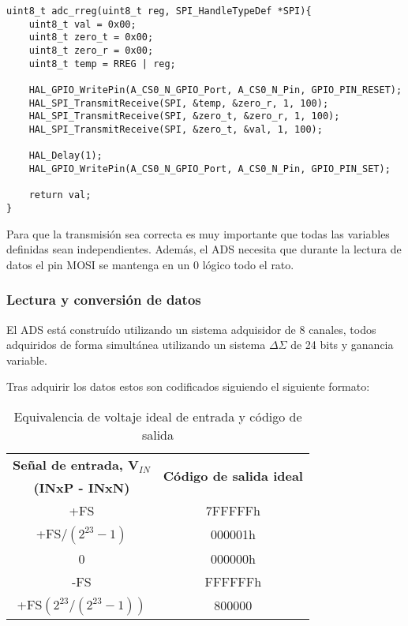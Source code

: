 \begin{lstlisting}[label=algoritmo:STM_rreg,style = STM-code,frame=single,caption=Lectura de registros del ADS]
uint8_t adc_rreg(uint8_t reg, SPI_HandleTypeDef *SPI){
	uint8_t val = 0x00;
	uint8_t zero_t = 0x00;
	uint8_t zero_r = 0x00;
	uint8_t temp = RREG | reg;
	
	HAL_GPIO_WritePin(A_CS0_N_GPIO_Port, A_CS0_N_Pin, GPIO_PIN_RESET);
	HAL_SPI_TransmitReceive(SPI, &temp, &zero_r, 1, 100);
	HAL_SPI_TransmitReceive(SPI, &zero_t, &zero_r, 1, 100);	
	HAL_SPI_TransmitReceive(SPI, &zero_t, &val, 1, 100);

	HAL_Delay(1);
	HAL_GPIO_WritePin(A_CS0_N_GPIO_Port, A_CS0_N_Pin, GPIO_PIN_SET);

	return val;
}
\end{lstlisting}

Para que la transmisión sea correcta es muy importante que todas las variables definidas sean independientes. Además, el ADS necesita que durante la lectura de datos el pin \textsc{MOSI} se mantenga en un 0 lógico todo el rato.

\subsubsection{Lectura y conversión de datos \label{sec:Software_micro_Datos}}

El ADS está construído utilizando un sistema adquisidor de 8 canales, todos adquiridos de forma simultánea utilizando un sistema $\Delta\Sigma$ de 24 bits y ganancia variable.

Tras adquirir los datos estos son codificados siguiendo el siguiente formato:
\begin{table} [H]
 \centering
 \begin{tabular}{|c|c|}
 \hline 
\textbf{Señal de entrada, V$_{IN}$} &  \multirow{2}{*}{\textbf{Código de salida ideal}}\\ 
 \textbf{(INxP - INxN)} &  \\ 
 \hline 
 +FS & 7FFFFFh\\ 
 \hline 
 +FS$/(2^{23}-1)$ & 000001h \\ 
 \hline 
 0 & 000000h\\ 
 \hline 
 -FS & FFFFFFh\\ 
 \hline 
 +FS$(2^{23}/(2^{23}-1))$ & 800000 \\ 
 \hline 
 \end{tabular} 
 \caption{Equivalencia de voltaje ideal de entrada y código de salida}
 \label{tab:ADS_equivalencia}
\end{table}

